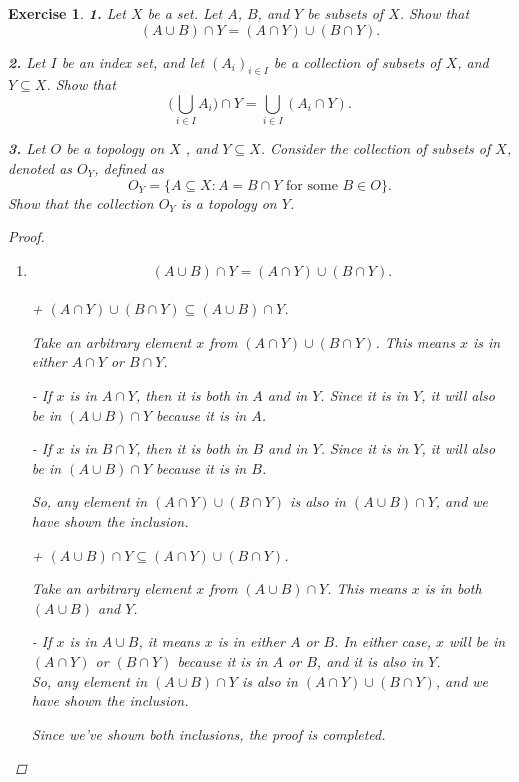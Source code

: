 \documentclass{article}
\newtheorem{exercise}{Exercise}
\begin{document}
    \begin{exercise}
        \textbf{1.}  Let $X$ be a set. Let $A$, $B$, and $Y$ be subsets of $X$. Show that
\[(A \cup B) \cap Y = (A \cap Y) \cup (B \cap Y).\]

    \textbf{2.}  Let $I$ be an index set, and let $(A_i)_{i \in I}$ be a collection of subsets of $X$, and $Y \subseteq X$. Show that
\[
\biggl(\bigcup_{i \in I} A_i\biggr) \cap Y = \bigcup_{i \in I} (A_i \cap Y).
\]

    \textbf{3.}  Let $O$ be a topology on $X$ , and $Y \subseteq X$. Consider the collection of subsets of $X$, denoted as $O_Y$, defined as
\[
O_Y = \{A \subseteq X : A = B \cap Y \text{ for some } B \in O\}.
\]
Show that the collection $O_Y$ is a topology on $Y$.

    \begin{proof}
    \begin{enumerate}
        
    
        \item \[(A \cup B) \cap Y = (A \cap Y) \cup (B \cap Y).\]\\
        + $(A \cap Y) \cup (B \cap Y) \subseteq (A \cup B) \cap Y$.

    Take an arbitrary element $x$ from $(A \cap Y) \cup (B \cap Y)$. This means $x$ is in either $A \cap Y$ or $B \cap Y$.

    - If $x$ is in $A \cap Y$, then it is both in $A$ and in $Y$. Since it is in $Y$, it will also be in $(A \cup B) \cap Y$ because it is in $A$.

    - If $x$ is in $B \cap Y$, then it is both in $B$ and in $Y$. Since it is in $Y$, it will also be in $(A \cup B) \cap Y$ because it is in $B$.

    So, any element in $(A \cap Y) \cup (B \cap Y)$ is also in $(A \cup B) \cap Y$, and we have shown the inclusion.

    + $(A \cup B) \cap Y \subseteq (A \cap Y) \cup (B \cap Y)$.

    Take an arbitrary element $x$ from $(A \cup B) \cap Y$. This means $x$ is in both $(A \cup B)$ and $Y$.

    - If $x$ is in $A \cup B$, it means $x$ is in either $A$ or $B$. In either case, $x$ will be in $(A \cap Y)$ or $(B \cap Y)$ because it is in $A$ or $B$, and it is also in $Y$.\\
    So, any element in $(A \cup B) \cap Y$ is also in $(A \cap Y) \cup (B \cap Y)$, and we have shown the inclusion.

    Since we've shown both inclusions, the proof is completed.


\end{enumerate}
\end{proof}
\end{exercise}
\end{document}
